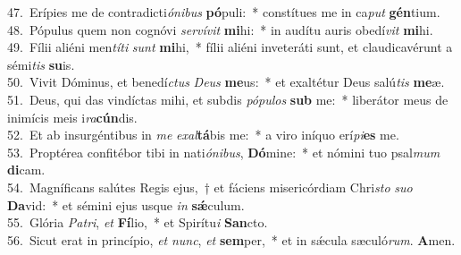 {47.~}Erípies me de contradicti\textit{ó}\textit{ni}\textit{bus} \textbf{pó}puli:~* constítues me in ca\textit{put} \textbf{gén}tium.\\
{48.~}Pópulus quem non cognóvi \textit{ser}\textit{ví}\textit{vit} \textbf{mi}hi:~* in audítu auris obedí\textit{vit} \textbf{mi}hi.\\
{49.~}Fílii aliéni men\textit{tí}\textit{ti} \textit{sunt} \textbf{mi}hi,~* fílii aliéni inveteráti sunt, et claudicavérunt a sémi\textit{tis} \textbf{su}is.\\
{50.~}Vivit Dóminus, et benedí\textit{ctus} \textit{De}\textit{us} \textbf{me}us:~* et exaltétur Deus salú\textit{tis} \textbf{me}æ.\\
{51.~}Deus, qui das vindíctas mihi, et subdis \textit{pó}\textit{pu}\textit{los} \textbf{sub} me:~* liberátor meus de inimícis meis i\textit{ra}\textbf{cún}dis.\\
{52.~}Et ab insurgéntibus in \textit{me} \textit{e}\textit{xal}\textbf{tá}bis me:~* a viro iníquo erí\textit{pi}\textbf{es} me.\\
{53.~}Proptérea confitébor tibi in nati\textit{ó}\textit{ni}\textit{bus}, \textbf{Dó}mine:~* et nómini tuo psal\textit{mum} \textbf{di}cam.\\
{54.~}Magníficans salútes Regis ejus,~† et fáciens misericórdiam Chri\textit{sto} \textit{su}\textit{o} \textbf{Da}vid:~* et sémini ejus usque \textit{in} \textbf{sǽ}culum.\\
{55.~}Glória \textit{Pa}\textit{tri}, \textit{et} \textbf{Fí}lio,~* et Spirítu\textit{i} \textbf{San}cto.\\
{56.~}Sicut erat in princípio, \textit{et} \textit{nunc}, \textit{et} \textbf{sem}per,~* et in sǽcula sæculó\textit{rum}. \textbf{A}men.\\
